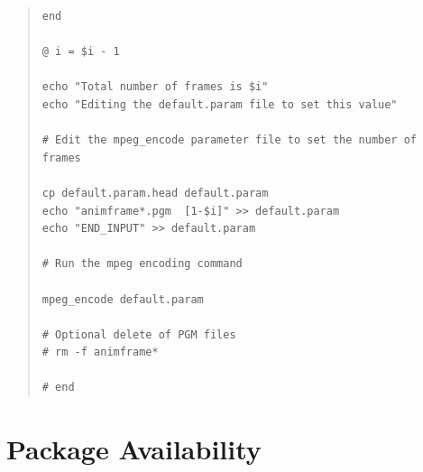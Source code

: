 \documentclass[twoside,11pt]{article}
\newcommand{\xlabel}[1]{}
\begin{document}
\begin{quote}
\begin{verbatim}
end

@ i = $i - 1

echo "Total number of frames is $i"
echo "Editing the default.param file to set this value"

# Edit the mpeg_encode parameter file to set the number of frames

cp default.param.head default.param
echo "animframe*.pgm  [1-$i]" >> default.param
echo "END_INPUT" >> default.param

# Run the mpeg encoding command

mpeg_encode default.param

# Optional delete of PGM files
# rm -f animframe*

# end
\end{verbatim}
\end{quote}
\normalsize

\section{\xlabel{sc15_available}Package Availability\label{sc15_available}}
\end{document}
